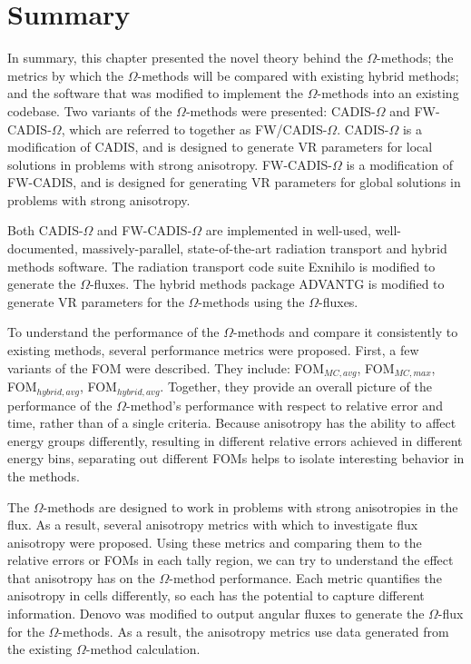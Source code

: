 \section*{Summary}

In summary, this chapter presented the novel theory behind the $\Omega$-methods;
the metrics by which the $\Omega$-methods will be compared with existing hybrid
methods; and the software that was modified to implement the $\Omega$-methods
into an existing codebase. Two variants of the $\Omega$-methods were presented:
CADIS-$\Omega$ and FW-CADIS-$\Omega$, which are referred to together as
FW/CADIS-$\Omega$. CADIS-$\Omega$ is a modification of CADIS, and is designed to
generate VR parameters for local solutions in problems with strong anisotropy.
FW-CADIS-$\Omega$ is a modification of FW-CADIS, and is designed for generating
VR parameters for global solutions in problems with strong anisotropy.

Both CADIS-$\Omega$ and FW-CADIS-$\Omega$ are implemented in well-used,
well-documented, massively-parallel, state-of-the-art radiation
transport and hybrid methods software. The
radiation transport code suite Exnihilo is modified to generate the
$\Omega$-fluxes. The hybrid methods package ADVANTG is modified to generate
VR parameters for the $\Omega$-methods using the $\Omega$-fluxes.

To understand the performance of the $\Omega$-methods and compare it
consistently to existing methods, several performance metrics were proposed. First,
a few variants of the FOM were described. They include: FOM$_{MC,avg}$,
FOM$_{MC,max}$, FOM$_{hybrid,avg}$, FOM$_{hybrid,avg}$. Together, they provide
an overall picture of the performance of the $\Omega$-method's performance with
respect to relative error and time, rather than of a
single criteria. Because anisotropy has the ability to affect energy groups
differently, resulting in different relative errors achieved in different energy
bins, separating out different FOMs helps to isolate interesting behavior
in the methods.

The $\Omega$-methods are designed to work in problems with strong
anisotropies in the flux. As a result, several anisotropy metrics
with which to investigate flux anisotropy were proposed.
Using these metrics and comparing them to
the relative errors or FOMs in each
tally region, we can try to understand the effect that anisotropy has on the
$\Omega$-method performance. Each metric quantifies the anisotropy in cells
differently, so each has the potential to capture different information. Denovo
was modified to output angular fluxes to generate the $\Omega$-flux for the
$\Omega$-methods.
As a result, the anisotropy metrics use data generated from the existing
$\Omega$-method calculation.

